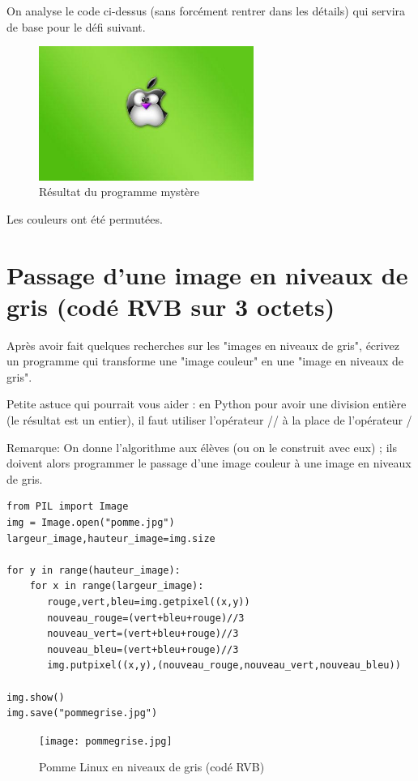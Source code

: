 \documentclass[11pt]{article}
\begin{document}
On analyse le code ci-dessus (sans forcément rentrer dans les détails) qui servira de base pour le défi suivant.

\begin{figure}[htbp]
\centering
\includegraphics[width=7cm]{pommeMystere.jpg}
\caption{Résultat du programme mystère}
\end{figure}

Les couleurs ont été permutées.


\section{Passage d'une image en niveaux de gris (codé RVB sur 3 octets)}
\label{sec:org8d2c88e}

Après avoir fait quelques recherches sur les "images en niveaux de gris", écrivez un programme qui transforme une "image couleur" en une "image en niveaux de gris".

Petite astuce qui pourrait vous aider : en Python pour avoir une division entière (le résultat est un entier), il faut utiliser l'opérateur // à la place de l'opérateur / 

Remarque: On donne l'algorithme aux élèves (ou on le construit avec eux) ; ils doivent alors programmer le passage d'une image couleur à une image en niveaux de gris.


\begin{verbatim}
from PIL import Image
img = Image.open("pomme.jpg")
largeur_image,hauteur_image=img.size

for y in range(hauteur_image):
    for x in range(largeur_image):
       rouge,vert,bleu=img.getpixel((x,y))
       nouveau_rouge=(vert+bleu+rouge)//3
       nouveau_vert=(vert+bleu+rouge)//3
       nouveau_bleu=(vert+bleu+rouge)//3
       img.putpixel((x,y),(nouveau_rouge,nouveau_vert,nouveau_bleu))

img.show()
img.save("pommegrise.jpg")
\end{verbatim}

\begin{figure}[htbp]
\centering
\texttt{[image: pommegrise.jpg]}
\caption{Pomme Linux en niveaux de gris (codé RVB)}
\end{figure}
\end{document}
